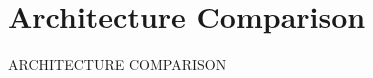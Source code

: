 \documentclass[../access.tex]{subfiles}
\begin{document}
\section{Architecture Comparison}
\label{sec:architecture_comparison}
ARCHITECTURE COMPARISON \cite{Sadia2020}
\end{document}
